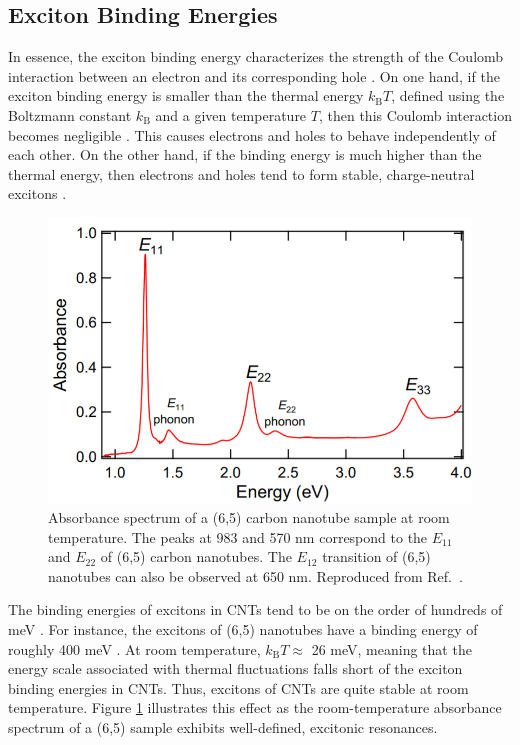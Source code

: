 \clearpage

\subsection{Exciton Binding Energies}

In essence, the exciton binding energy characterizes the strength of the Coulomb interaction between an electron and its corresponding hole \cite{valkunas2006exciton}. On one hand, if the exciton binding energy is smaller than the thermal energy $k_\text{B} T$, defined using the Boltzmann constant $k_\text{B}$ and a given temperature $T$, then this Coulomb interaction becomes negligible \cite{valkunas2006exciton}. This causes electrons and holes to behave independently of each other. On the other hand, if the binding energy is much higher than the thermal energy, then electrons and holes tend to form stable, charge-neutral excitons \cite{valkunas2006exciton}.

\begin{figure}[ht]
	\centering
	\includegraphics[scale=0.6]{images/chapter_intro/abs_fumiya}
	\caption{Absorbance spectrum of a (6,5) carbon nanotube sample at room temperature. The peaks at 983 and 570 nm correspond to the $E_{11}$ and $E_{22}$ of (6,5) carbon nanotubes. The $E_{12}$ transition of (6,5) nanotubes can also be observed at 650 nm. Reproduced from Ref.\ \cite{katsutani2019direct}. }
	\label{fig:cnt_abs_fumiya}
\end{figure}

The binding energies of excitons in CNTs tend to be on the order of hundreds of meV \cite{wang2005optical}. For instance, the excitons of (6,5) nanotubes have a binding energy of roughly 400 meV \cite{wang2005optical}. At room temperature, $k_\text{B} T \approx$ 26 meV, meaning that the energy scale associated with thermal fluctuations falls short of the exciton binding energies in CNTs. Thus, excitons of CNTs are quite stable at room temperature. Figure \ref{fig:cnt_abs_fumiya} illustrates this effect as the room-temperature absorbance spectrum of a (6,5) sample exhibits well-defined, excitonic resonances.

